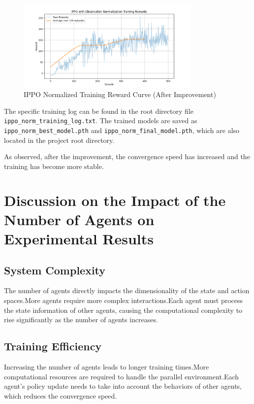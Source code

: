 \documentclass[12pt]{article}
\begin{document}
\begin{figure}[H]
    \centering
    \includegraphics[width=0.8\textwidth]{ippo_norm_training_rewards.png}
    \caption{IPPO Normalized Training Reward Curve (After Improvement)}
    \label{fig:ippo_rewards_after}
\end{figure}

The specific training log can be found in the root directory file \texttt{ippo\_norm\_training\_log.txt}. The trained models are saved as \texttt{ippo\_norm\_best\_model.pth} and \texttt{ippo\_norm\_final\_model.pth}, which are also located in the project root directory.

As observed, after the improvement, the convergence speed has increased and the training has become more stable.

\section{Discussion on the Impact of the Number of Agents on Experimental Results}

\subsection{System Complexity}
The number of agents directly impacts the dimensionality of the state and action spaces.More agents require more complex interactions.Each agent must process the state information of other agents, causing the computational complexity to rise significantly as the number of agents increases.

\subsection{Training Efficiency}
Increasing the number of agents leads to longer training times.More computational resources are required to handle the parallel environment.Each agent’s policy update needs to take into account the behaviors of other agents, which reduces the convergence speed.
\end{document}
